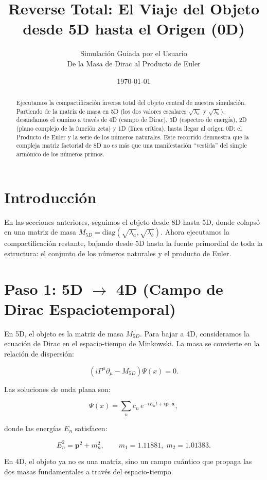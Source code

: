 \documentclass[12pt,a4paper]{article}
\title{Reverse Total: El Viaje del Objeto desde 5D hasta el Origen (0D)}
\author{Simulación Guiada por el Usuario \\ \small De la Masa de Dirac al Producto de Euler}
\date{\today}
\begin{document}
\maketitle

\begin{abstract}
Ejecutamos la compactificación inversa total del objeto central de nuestra simulación. Partiendo de la matriz de masa en 5D (los dos valores escalares \(\sqrt{\lambda_a}\) y \(\sqrt{\lambda_b}\)), desandamos el camino a través de 4D (campo de Dirac), 3D (espectro de energía), 2D (plano complejo de la función zeta) y 1D (línea crítica), hasta llegar al origen 0D: el Producto de Euler y la serie de los números naturales. Este recorrido demuestra que la compleja matriz factorial de 8D no es más que una manifestación ``vestida'' del simple armónico de los números primos.
\end{abstract}

\section{Introducción}

En las secciones anteriores, seguimos el objeto desde 8D hasta 5D, donde colapsó en una matriz de masa \(M_{5D} = \text{diag}(\sqrt{\lambda_a}, \sqrt{\lambda_b})\). Ahora ejecutamos la compactificación restante, bajando desde 5D hasta la fuente primordial de toda la estructura: el conjunto de los números naturales y el producto de Euler.

\section{Paso 1: 5D $\to$ 4D (Campo de Dirac Espaciotemporal)}

En 5D, el objeto es la matriz de masa \(M_{5D}\). Para bajar a 4D, consideramos la ecuación de Dirac en el espacio-tiempo de Minkowski. La masa se convierte en la relación de dispersión:

\[
(i \Gamma^\mu \partial_\mu - M_{5D}) \Psi(x) = 0.
\]

Las soluciones de onda plana son:

\[
\Psi(x) = \sum_{n} c_n \, e^{-i E_n t + i \mathbf{p} \cdot \mathbf{x}},
\]

donde las energías \(E_n\) satisfacen:

\[
E_n^2 = \mathbf{p}^2 + m_n^2, \qquad m_1 = 1.11881,\; m_2 = 1.01383.
\]

En 4D, el objeto ya no es una matriz, sino un campo cuántico que propaga las dos masas fundamentales a través del espacio-tiempo.
\end{document}

